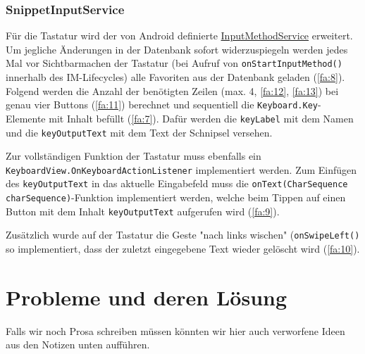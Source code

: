 \documentclass[11pt]{article}
\begin{document}
			\subsubsection{Snippet\-Input\-Service}
				Für die Tastatur wird der von Android definierte \href{https://developer.android.com/guide/topics/text/creating-input-method}{InputMethodService} erweitert.
				Um jegliche Änderungen in der Datenbank sofort widerzuspiegeln werden jedes Mal vor Sichtbarmachen der Tastatur (bei Aufruf von \texttt{onStartInputMethod()} innerhalb des IM-Lifecycles) alle Favoriten aus der Datenbank geladen (\ref{fa:8}). Folgend werden die Anzahl der benötigten Zeilen (max. 4, \ref{fa:12}, \ref{fa:13}) bei genau vier Buttons (\ref{fa:11}) berechnet und sequentiell die \texttt{Keyboard.Key}-Elemente mit Inhalt befüllt (\ref{fa:7}). Dafür werden die \texttt{keyLabel} mit dem Namen und die \texttt{keyOutputText} mit dem Text der Schnipsel versehen.\newline
				
				\noindent Zur vollständigen Funktion der Tastatur muss ebenfalls ein \texttt{KeyboardView.OnKeyboardActionListener} implementiert werden. Zum Einfügen des \texttt{keyOutputText} in das aktuelle Eingabefeld muss die \texttt{onText(CharSequence charSequence)}-Funktion implementiert werden, welche beim Tippen auf einen Button mit dem Inhalt \texttt{keyOutputText} aufgerufen wird (\ref{fa:9}).\newline
				
				\noindent Zusätzlich wurde auf der Tastatur die Geste "nach links wischen" (\texttt{onSwipeLeft()} so implementiert, dass der zuletzt eingegebene Text wieder gelöscht wird (\ref{fa:10}).
				
		
	
\section{Probleme und deren Lösung}
	Falls wir noch Prosa schreiben müssen könnten wir hier auch verworfene Ideen aus den Notizen unten aufführen.
\end{document}
